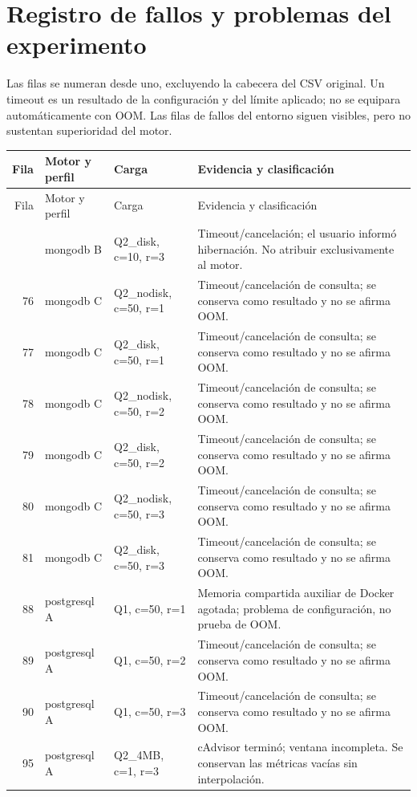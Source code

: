 \documentclass[11pt,letterpaper]{article}
\begin{document}
\section{Registro de fallos y problemas del experimento}
Las filas se numeran desde uno, excluyendo la cabecera del CSV original. Un timeout es un resultado de la configuración y del límite aplicado; no se equipara automáticamente con OOM. Las filas de fallos del entorno siguen visibles, pero no sustentan superioridad del motor.
{\small\begin{longtable}{r>{\raggedright\arraybackslash}p{3cm}>{\raggedright\arraybackslash}p{2.7cm}>{\raggedright\arraybackslash}p{6.5cm}}
\toprule Fila & Motor y perfil & Carga & Evidencia y clasificación\\\midrule\endfirsthead
\toprule Fila & Motor y perfil & Carga & Evidencia y clasificación\\\midrule\endhead\bottomrule\endfoot
48 & mongodb B & Q2\_disk, c=10, r=3 & Timeout/cancelación; el usuario informó hibernación. No atribuir exclusivamente al motor.\\
76 & mongodb C & Q2\_nodisk, c=50, r=1 & Timeout/cancelación de consulta; se conserva como resultado y no se afirma OOM.\\
77 & mongodb C & Q2\_disk, c=50, r=1 & Timeout/cancelación de consulta; se conserva como resultado y no se afirma OOM.\\
78 & mongodb C & Q2\_nodisk, c=50, r=2 & Timeout/cancelación de consulta; se conserva como resultado y no se afirma OOM.\\
79 & mongodb C & Q2\_disk, c=50, r=2 & Timeout/cancelación de consulta; se conserva como resultado y no se afirma OOM.\\
80 & mongodb C & Q2\_nodisk, c=50, r=3 & Timeout/cancelación de consulta; se conserva como resultado y no se afirma OOM.\\
81 & mongodb C & Q2\_disk, c=50, r=3 & Timeout/cancelación de consulta; se conserva como resultado y no se afirma OOM.\\
88 & postgresql A & Q1, c=50, r=1 & Memoria compartida auxiliar de Docker agotada; problema de configuración, no prueba de OOM.\\
89 & postgresql A & Q1, c=50, r=2 & Timeout/cancelación de consulta; se conserva como resultado y no se afirma OOM.\\
90 & postgresql A & Q1, c=50, r=3 & Timeout/cancelación de consulta; se conserva como resultado y no se afirma OOM.\\
95 & postgresql A & Q2\_4MB, c=1, r=3 & cAdvisor terminó; ventana incompleta. Se conservan las métricas vacías sin interpolación.\\

\end{longtable}}
\end{document}
